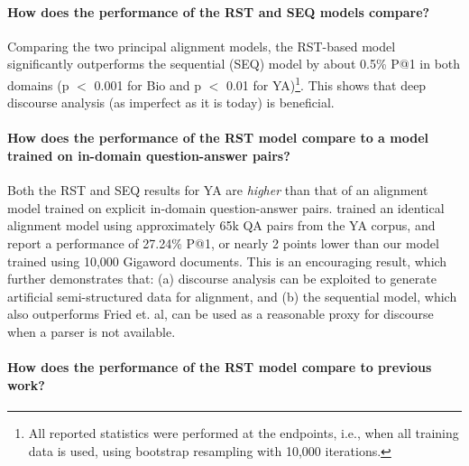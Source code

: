 \paragraph{How does the performance of the RST and SEQ models compare?}

Comparing the two principal alignment models, the RST-based model significantly outperforms the sequential (SEQ) model by about 0.5\% P@1 in both domains (p $<$ 0.001 for Bio and p $<$ 0.01 for YA)\footnote{All reported statistics were performed at the endpoints, i.e., when all training data is used, using bootstrap resampling with 10,000 iterations.}. This shows that deep discourse analysis (as imperfect as it is today) is beneficial. 

\paragraph{How does the performance of the RST model compare to a model trained on in-domain question-answer pairs?}

Both the RST and SEQ results for YA are {\em higher} than that of an alignment model trained on explicit in-domain question-answer pairs. \citet{fried2015higher} trained an identical alignment model using approximately 65k QA pairs from the YA corpus, and report a performance of 27.24\% P@1, or nearly 2 points lower than our model trained using 10,000 Gigaword documents. This is an encouraging result, which further demonstrates that: (a) discourse analysis can be exploited to generate artificial semi-structured data for alignment, and (b) the sequential model, which also outperforms Fried et. al, can be used as a reasonable proxy for discourse when a parser is not available. 

\paragraph{How does the performance of the RST model compare to previous work?}

